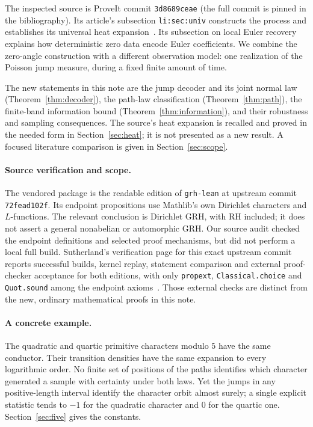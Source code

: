 \documentclass[11pt]{article}
\theoremstyle{definition}
\begin{document}
The inspected source is ProveIt commit
\texttt{3d8689ceae} (the full commit is pinned in the bibliography). Its article's subsection
\texttt{li:sec:univ} constructs the process and establishes its universal heat
expansion~\cite{ProveItArticle}. Its subsection on local Euler recovery explains
how deterministic zero data encode Euler coefficients. We combine the
zero-angle construction with a different observation model: one realization of
the Poisson jump measure, during a fixed finite amount of time.

The new statements in this note are the jump decoder and its joint normal law
(Theorem~\ref{thm:decoder}), the path-law classification
(Theorem~\ref{thm:path}), the finite-band information bound
(Theorem~\ref{thm:information}), and their robustness and sampling consequences.
The source's heat expansion is recalled and proved in the needed form in
Section~\ref{sec:heat}; it is not presented as a new result. A focused literature
comparison is given in Section~\ref{sec:scope}.

\paragraph{Source verification and scope.}
The vendored package is the readable edition of \texttt{grh-lean} at upstream
commit \texttt{72fead102f}. Its endpoint propositions use Mathlib's own
Dirichlet characters and $L$-functions. The relevant conclusion is Dirichlet
GRH, with RH included; it does not assert a general nonabelian or automorphic
GRH. Our source audit checked the endpoint definitions and selected proof
mechanisms, but did not perform a local full build. Sutherland's verification
page for this exact upstream commit reports successful builds, kernel replay,
statement comparison and external proof-checker acceptance for both editions,
with only \texttt{propext}, \texttt{Classical.choice} and \texttt{Quot.sound}
among the endpoint axioms~\cite{Sutherland}. Those external checks are distinct
from the new, ordinary mathematical proofs in this note.

\paragraph{A concrete example.}
The quadratic and quartic primitive characters modulo $5$ have the same
conductor. Their transition densities have the same expansion to every
logarithmic order. No finite set of positions of the paths identifies which
character generated a sample with certainty under both laws. Yet the jumps in
any positive-length interval identify the character orbit almost surely; a
single explicit statistic tends to $-1$ for the quadratic character and $0$ for
the quartic one. Section~\ref{sec:five} gives the constants.
\end{document}
